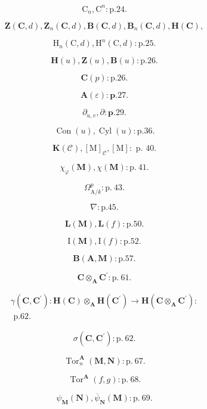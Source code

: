 \[
\mathrm{C} _ {n}, \mathrm{C} ^ {n}: \mathrm{p}. 2 4.
\]

\[
\mathbf {Z} (\mathbf {C}, d), \mathbf {Z} _ {n} (\mathbf {C}, d), \mathbf {B} (\mathbf {C}, d), \mathbf {B} _ {n} (\mathbf {C}, d), \mathbf {H} (\mathbf {C}),
\]

\[
\mathrm{H} _ {n} (\mathrm{C}, d), \mathrm{H} ^ {n} (\mathrm{C}, d): \mathrm{p}. 2 5.
\]

\[
\mathbf {H} (u), \mathbf {Z} (u), \mathbf {B} (u): \mathrm{p.26}.
\]

\[
\mathbf {C} (p): \mathrm{p.26}.
\]

\[
\mathbf {A} (\varepsilon): \mathbf {p}. 2 7.
\]

\[
\partial_ {u, v}, \partial : \mathbf {p}. 2 9.
\]

\[
\operatorname{Con} (u), \operatorname{Cyl} (u): \mathrm{p.36}.
\]

\[
\mathbf {K} (\mathcal {C}), [ \mathrm{M} ] _ {\mathcal {C}}, [ \mathrm{M} ]: \text { p. } 4 0.
\]

\[
\chi_ {\varphi} (\mathbf {M}), \chi (\mathbf {M}): \mathrm{p.~41}.
\]

\[
\Omega_ {\mathrm{A} / k} ^ {p}: \mathrm{p.~43.}
\]

\[
\nabla : \mathrm{p}. 4 5.
\]

\[
\mathbf {L} (\mathbf {M}), \mathbf {L} (f): \mathrm{p.} 5 0.
\]

\[
\mathrm{I} (\mathbf {M}), \mathrm{I} (f): \mathrm{p}. 5 2.
\]

\[
\mathbf {B} (\mathbf {A}, \mathbf {M}): \mathrm{p.} 5 7.
\]

\[
\mathbf {C} \otimes_ {\mathbf {A}} \mathbf {C} ^ {\prime}: \mathrm{p.~61}.
\]

\[
\begin{array}{l}\gamma (\mathbf {C}, \mathbf {C} ^ {\prime}): \mathbf {H} (\mathbf {C}) \otimes_ {\mathbf {A}} \mathbf {H} (\mathbf {C} ^ {\prime}) \rightarrow \mathbf {H} (\mathbf {C} \otimes_ {\mathbf {A}} \mathbf {C} ^ {\prime}):\\\text { p.62. }\end{array}
\]

\[
\sigma (\mathbf {C}, \mathbf {C} ^ {\prime}): \mathrm{p.~62.}
\]

\[
\operatorname{Tor} _ {n} ^ {\mathbf {A}} (\mathbf {M}, \mathbf {N}): \mathrm{p.~67}.
\]

\[
\operatorname{Tor} ^ {\mathbf {A}} (f, g): \mathrm{p.~68}.
\]

\[
\psi_ {\mathbf {M}} (\mathbf {N}), \overline {{\psi}} _ {\mathbf {N}} (\mathbf {M}): \mathrm{p.~69}.
\]

